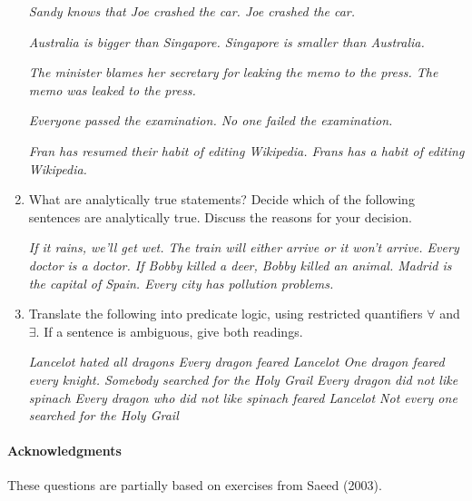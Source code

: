 \documentclass[a4paper]{article}
\newcommand{\ix}{\ex\it}
\begin{document}
\begin{enumerate}
\begin{exe}
\ex
  \begin{xlist}
 \ix Sandy knows that Joe crashed the car. 
 \ix Joe crashed the car. 
\end{xlist}
\ex 
  \begin{xlist}
    \ix Australia is bigger than Singapore. 
    \ix Singapore is smaller than Australia. 
  \end{xlist}
\ex 
  \begin{xlist}
\ix The minister blames her secretary for leaking the memo to the press. 
\ix The memo was leaked to the press. 
\end{xlist}
\ex 
  \begin{xlist}
\ix Everyone passed the examination. 
\ix No one failed the examination. 
\end{xlist}
\ex 
\begin{xlist}
  \ix Fran has resumed their habit of editing Wikipedia. 
  \ix Frans has a habit of editing Wikipedia. 
\end{xlist}
\end{exe}

\newpage
\item  What are analytically true statements? Decide which of the 
following sentences are analytically true. Discuss the reasons for your decision. 
\begin{exe}
  \ix If it rains, we'll get wet. 
  \ix The train will either arrive or it won't arrive. 
  \ix Every doctor is a doctor. 
  \ix If Bobby killed a deer, Bobby killed an animal. 
  \ix Madrid is the capital of Spain. 
  \ix Every city has pollution problems. 
\end{exe}

\item Translate the following into predicate logic, using restricted
  quantifiers $\forall$ and $\exists$.  If a sentence is ambiguous,
  give both readings.
  \begin{exe}
    \ix Lancelot hated all dragons
    \ix Every dragon feared Lancelot
    \ix One dragon feared every knight.
    \ix Somebody searched for the Holy Grail
    \ix Every dragon did not like spinach
    \ix Every dragon who did not like spinach feared Lancelot
    \ix Not every one searched for the Holy Grail
  \end{exe}
\end{enumerate}

\vfill
\paragraph{Acknowledgments} These questions are partially
based on exercises from Saeed (2003).
\end{document}
